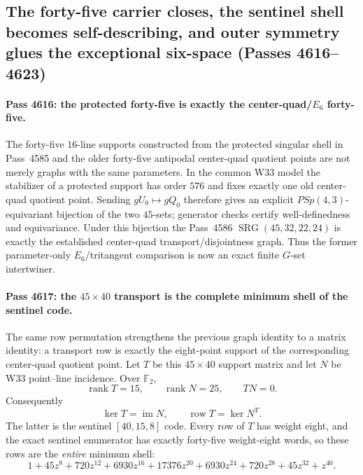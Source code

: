 \subsection{The forty-five carrier closes, the sentinel shell becomes self-describing, and outer symmetry glues the exceptional six-space (Passes 4616--4623)}
\label{sec:pass4616-4623-e6-sentinel-triality-rank}

\paragraph{Pass 4616: the protected forty-five is exactly the center-quad/$E_6$ forty-five.}
The forty-five $16$-line supports constructed from the protected singular shell
in Pass~4585 and the older forty-five antipodal center-quad quotient points are
not merely graphs with the same parameters.  In the common W33 model the
stabilizer of a protected support has order $576$ and fixes exactly one old
center-quad quotient point.  Sending $gU_0\mapsto gQ_0$ therefore gives an
explicit $PSp(4,3)$-equivariant bijection of the two $45$-sets; generator
checks certify well-definedness and equivariance.  Under this bijection the
Pass~4586 $\operatorname{SRG}(45,32,22,24)$ is exactly the established
center-quad transport/disjointness graph.  Thus the former parameter-only
$E_6$/tritangent comparison is now an exact finite $G$-set intertwiner.

\paragraph{Pass 4617: the $45\times40$ transport is the complete minimum shell of the sentinel code.}
The same row permutation strengthens the previous graph identity to a matrix
identity: a transport row is exactly the eight-point support of the corresponding
center-quad quotient point.  Let $T$ be this $45\times40$ support matrix and let
$N$ be W33 point--line incidence.  Over $\mathbb F_2$,
\[
 \operatorname{rank}T=15,\qquad \operatorname{rank}N=25,\qquad TN=0.
\]
Consequently
\[
 \boxed{\ker T=\operatorname{im}N},\qquad
 \boxed{\operatorname{row}T=\ker N^T}.
\]
The latter is the sentinel $[40,15,8]$ code.  Every row of $T$ has weight eight,
and the exact sentinel enumerator has exactly forty-five weight-eight words, so
these rows are the \emph{entire} minimum shell:
\[
 1+45z^8+720z^{12}+6930z^{16}+17376z^{20}
 +6930z^{24}+720z^{28}+45z^{32}+z^{40}.
\]

